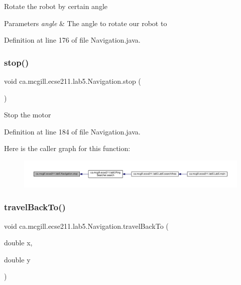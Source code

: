 Rotate the robot by certain angle


\begin{DoxyParams}{Parameters}
{\em angle} & The angle to rotate our robot to \\
\hline
\end{DoxyParams}


Definition at line 176 of file Navigation.\+java.

\mbox{\label{classca_1_1mcgill_1_1ecse211_1_1lab5_1_1_navigation_afe038af6692e7ad28c3587cd979d7223}} 
\subsubsection{\texorpdfstring{stop()}{stop()}}
{\footnotesize\ttfamily void ca.\+mcgill.\+ecse211.\+lab5.\+Navigation.\+stop (\begin{DoxyParamCaption}{ }\end{DoxyParamCaption})}

Stop the motor 

Definition at line 184 of file Navigation.\+java.

Here is the caller graph for this function\+:
\nopagebreak
\begin{figure}[H]
\begin{center}
\leavevmode
\includegraphics[width=350pt]{classca_1_1mcgill_1_1ecse211_1_1lab5_1_1_navigation_afe038af6692e7ad28c3587cd979d7223_icgraph}
\end{center}
\end{figure}
\mbox{\label{classca_1_1mcgill_1_1ecse211_1_1lab5_1_1_navigation_aacb83ee18419dcd6095e331975cf2167}} 
\subsubsection{\texorpdfstring{travel\+Back\+To()}{travelBackTo()}}
{\footnotesize\ttfamily void ca.\+mcgill.\+ecse211.\+lab5.\+Navigation.\+travel\+Back\+To (\begin{DoxyParamCaption}\item[{double}]{x,  }\item[{double}]{y }\end{DoxyParamCaption})}


